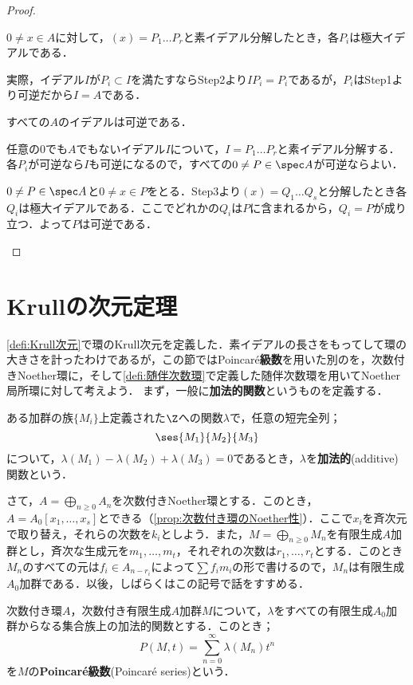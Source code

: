 \begin{proof}
\begin{step}
		\item $0\neq x\in A$に対して，$(x)=P_1\dots P_r$と素イデアル分解したとき，各$P_i$は極大イデアルである．
		
		実際，イデアル$I$が$P_i\subset I$を満たすならStep2より$IP_i=P_i$であるが，$P_i$はStep1より可逆だから$I=A$である．
		
		\item すべての$A$のイデアルは可逆である．
		
		任意の0でも$A$でもないイデアル$I$について，$I=P_1\dots P_r$と素イデアル分解する．各$P_i$が可逆なら$I$も可逆になるので，すべての$0\neq P\in\spec A$が可逆ならよい．
		
		$0\neq P\in\spec A$と$0\neq x\in P$をとる．Step3より$(x)=Q_1\dots Q_s$と分解したとき各$Q_i$は極大イデアルである．ここでどれかの$Q_i$は$P$に含まれるから，$Q_i=P$が成り立つ．よって$P$は可逆である．
	\end{step}
\end{proof}

\section{Krullの次元定理}
\ref{defi:Krull次元}で環のKrull次元を定義した．素イデアルの長さをもってして環の大きさを計ったわけであるが，この節ではPoincar\'e\textbf{級数}を用いた別のを，次数付きNoether環に，そして\ref{defi:随伴次数環}で定義した随伴次数環を用いてNoether局所環に対して考えよう．
まず，一般に\textbf{加法的関数}というものを定義する．
\begin{defi}[加法的関数]
	ある加群の族$\{M_i\}$上定義された$\Z$への関数$\lambda$で，任意の短完全列；
	\[\ses{M_1}{M_2}{M_3}\]
	について，$\lambda(M_1)-\lambda(M_2)+\lambda(M_3)=0$であるとき，$\lambda$を\textbf{加法的}(additive)関数という．
\end{defi}

さて，$A=\bigoplus_{n\geq0}A_n$を次数付きNoether環とする．このとき，$A=A_0[x_1,\dots,x_s]$とできる（\ref{prop:次数付き環のNoether性}）．ここで$x_i$を斉次元で取り替え，それらの次数を$k_i$としよう．また，$M=\bigoplus_{n\geq0}M_n$を有限生成$A$加群とし，斉次な生成元を$m_1,\dots,m_t$，それぞれの次数は$r_1,\dots,r_t$とする．このとき$M_n$のすべての元は$f_i\in A_{n-r_i}$によって$\sum f_im_i$の形で書けるので，$M_n$は有限生成$A_0$加群である．以後，しばらくはこの記号で話をすすめる．

\begin{defi}
	次数付き環$A$，次数付き有限生成$A$加群$M$について，$\lambda$をすべての有限生成$A_0$加群からなる集合族上の加法的関数とする．このとき；
	\[P(M,t)=\sum_{n=0}^\infty \lambda(M_n)t^n\]
	を$M$の\textbf{Poincar\'e級数}(Poincar\'e series)という．
\end{defi}

